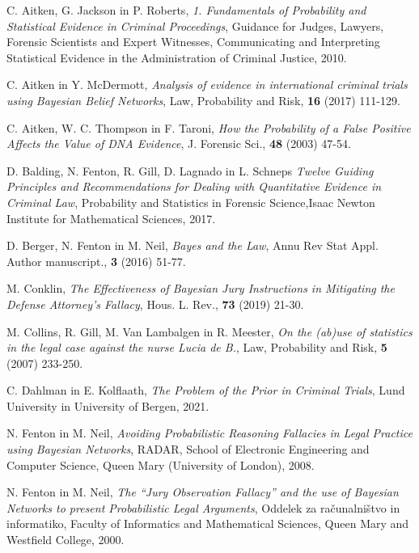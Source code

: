 \documentclass[mat1, tisk]{fmfdelo}
\theoremstyle{definition} %
\theoremstyle{trditev} %
\theoremstyle{izrek}
\begin{document}
\begin{thebibliography}{99}
        C. Aitken, G. Jackson in P. Roberts, \emph{1. Fundamentals of Probability and Statistical Evidence in Criminal Proceedings}, Guidance for Judges, Lawyers, Forensic Scientists and Expert Witnesses, Communicating and Interpreting Statistical Evidence in the Administration of Criminal Justice, 2010.

        C. Aitken in Y. McDermott, \emph{Analysis of evidence in international criminal trials using Bayesian Belief Networks}, Law, Probability and Risk, \textbf{16} (2017) 111-129.

        C. Aitken, W. C. Thompson in F. Taroni, \emph{How the Probability of a False Positive Affects the Value of DNA Evidence}, J. Forensic Sci., \textbf{48} (2003) 47-54.

        D. Balding, N. Fenton, R. Gill, D. Lagnado in L. Schneps \emph{Twelve Guiding Principles and Recommendations for Dealing with Quantitative Evidence in Criminal Law}, Probability and Statistics in Forensic Science,Isaac Newton Institute for Mathematical Sciences, 2017.

        D. Berger, N. Fenton in M. Neil, \emph{Bayes and the Law}, Annu Rev Stat Appl. Author manuscript., \textbf{3} (2016) 51-77.

        M. Conklin, \emph{The Effectiveness of Bayesian Jury Instructions in Mitigating the Defense Attorney's Fallacy}, Hous. L. Rev., \textbf{73} (2019) 21-30.

        M. Collins, R. Gill, M. Van Lambalgen in R. Meester, \emph{On the (ab)use of statistics in the legal case against the nurse Lucia de B.}, Law, Probability and Risk, \textbf{5} (2007) 233-250.

        C. Dahlman in E. Kolflaath, \emph{The Problem of the Prior in Criminal Trials}, Lund University in University of Bergen, 2021.

        N. Fenton in M. Neil, \emph{Avoiding Probabilistic Reasoning Fallacies in Legal Practice using Bayesian Networks}, RADAR, School of Electronic Engineering and Computer Science, Queen Mary (University of London), 2008.

        N. Fenton in M. Neil, \emph{The “Jury Observation Fallacy” and the use of Bayesian Networks to present Probabilistic Legal Arguments}, Oddelek za računalništvo in informatiko, Faculty of Informatics and Mathematical Sciences, Queen Mary and Westfield College, 2000.


\end{thebibliography}
\end{document}
